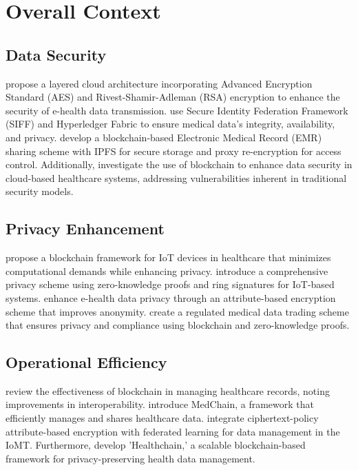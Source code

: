 \documentclass[cic,tc,english]{iiufrgs}
\begin{document}


    \section{Overall Context}
        \label{sec:overallcontext}
            
        \subsection{Data Security} 
            \citet{Memos2021} propose a layered cloud architecture incorporating Advanced Encryption Standard (AES) and Rivest-Shamir-Adleman (RSA) encryption to enhance the security of e-health data transmission. \citet{Tian2019} use Secure Identity Federation Framework (SIFF) and Hyperledger Fabric to ensure medical data's integrity, availability, and privacy. \citet{Liu2024} develop a blockchain-based Electronic Medical Record (EMR) sharing scheme with IPFS for secure storage and proxy re-encryption for access control. Additionally, \citet{Esposito2018} investigate the use of blockchain to enhance data security in cloud-based healthcare systems, addressing vulnerabilities inherent in traditional security models.
        
        \subsection{Privacy Enhancement} 
            \citet{Dwivedi2019} propose a blockchain framework for IoT devices in healthcare that minimizes computational demands while enhancing privacy. \citet{Esfahani2024} introduce a comprehensive privacy scheme using zero-knowledge proofs and ring signatures for IoT-based systems. \citet{Zala2024} enhance e-health data privacy through an attribute-based encryption scheme that improves anonymity. \citet{Li2024} create a regulated medical data trading scheme that ensures privacy and compliance using blockchain and zero-knowledge proofs.
        
        \subsection{Operational Efficiency} 
            \citet{Vazirani2019} review the effectiveness of blockchain in managing healthcare records, noting improvements in interoperability. \citet{Shen2019} introduce MedChain, a framework that efficiently manages and shares healthcare data. \citet{Bhansali2022} integrate ciphertext-policy attribute-based encryption with federated learning for data management in the IoMT. Furthermore, \citet{XuJie2019} develop 'Healthchain,' a scalable blockchain-based framework for privacy-preserving health data management.
        
\end{document}
